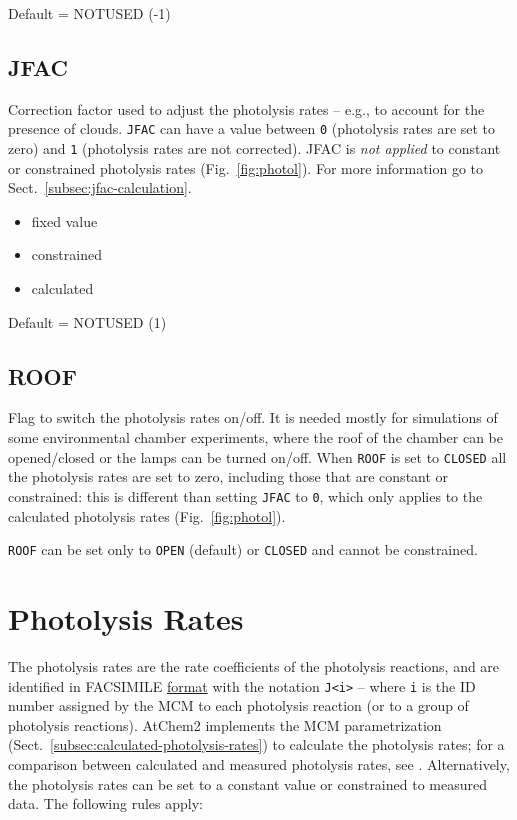 Default = NOTUSED (-1)

\subsection{JFAC} \label{subsec:jfac}

Correction factor used to adjust the photolysis rates -- e.g., to
account for the presence of clouds. \texttt{JFAC} can have a value
between \texttt{0} (photolysis rates are set to zero) and \texttt{1}
(photolysis rates are not corrected). JFAC is \emph{not applied} to
constant or constrained photolysis rates (Fig.~\ref{fig:photol}). For
more information go to Sect.~\ref{subsec:jfac-calculation}.

\begin{itemize}
\item fixed value
\item constrained
\item calculated
\end{itemize}

Default = NOTUSED (1)

\subsection{ROOF} \label{subsec:roof}

Flag to switch the photolysis rates on/off. It is needed mostly for
simulations of some environmental chamber experiments, where the roof
of the chamber can be opened/closed or the lamps can be turned on/off.
When \texttt{ROOF} is set to \texttt{CLOSED} all the photolysis rates
are set to zero, including those that are constant or constrained:
this is different than setting \texttt{JFAC} to \texttt{0}, which only
applies to the calculated photolysis rates (Fig.~\ref{fig:photol}).

\texttt{ROOF} can be set only to \texttt{OPEN} (default) or
\texttt{CLOSED} and cannot be constrained.

\section{Photolysis Rates} \label{sec:photolysis-rates}

The photolysis rates are the rate coefficients of the photolysis
reactions, and are identified in FACSIMILE
\hyperref[subsec:facsimile-format]{format} with the notation
\texttt{J<i>} -- where \texttt{i} is the ID number assigned by the MCM
to each photolysis reaction (or to a group of photolysis
reactions). AtChem2 implements the MCM parametrization
(Sect.~\ref{subsec:calculated-photolysis-rates}) to calculate the
photolysis rates; for a comparison between calculated and measured
photolysis rates, see \citet{sommariva_2020}. Alternatively, the
photolysis rates can be set to a constant value or constrained to
measured data. The following rules apply:

